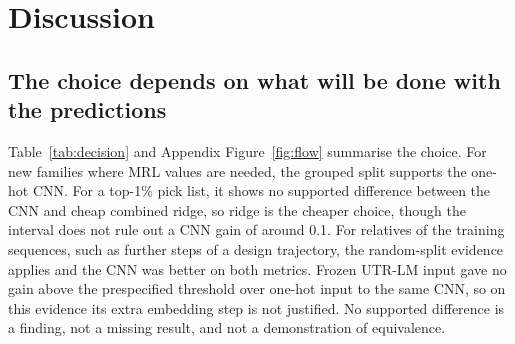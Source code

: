 \documentclass[11pt]{article}
\begin{document}
\section{Discussion}\label{sec:discussion}
\subsection{The choice depends on what will be done with the predictions}
Table~\ref{tab:decision} and Appendix Figure~\ref{fig:flow} summarise the choice. For new families where MRL values
are needed, the grouped split supports the one-hot CNN. For a top-1\% pick list, it shows no supported difference
between the CNN and cheap combined ridge, so ridge is the cheaper choice, though the interval does not rule out a CNN
gain of around 0.1. For relatives of the training sequences, such as further steps of a design trajectory, the
random-split evidence applies and the CNN was better on both metrics. Frozen UTR-LM input gave no gain above the
prespecified threshold over one-hot input to the same CNN, so on this evidence its extra embedding step is not
justified. No supported difference is a finding, not a missing result, and not a demonstration of equivalence.
\end{document}
